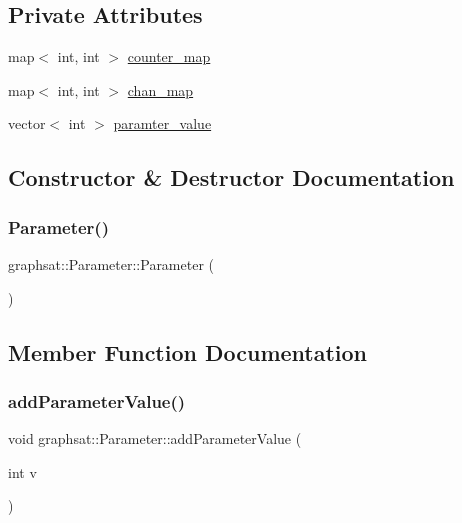 \subsection*{Private Attributes}
\begin{DoxyCompactItemize}
\item 
map$<$ int, int $>$ \mbox{\hyperlink{classgraphsat_1_1_parameter_a914222478bfceb8c804e00f39d60af64}{counter\+\_\+map}}
\item 
map$<$ int, int $>$ \mbox{\hyperlink{classgraphsat_1_1_parameter_ae05216a7ab70e07cfe1195338632d809}{chan\+\_\+map}}
\item 
vector$<$ int $>$ \mbox{\hyperlink{classgraphsat_1_1_parameter_aedd52a64c271b60c113f99e0e0ae9d6c}{paramter\+\_\+value}}
\end{DoxyCompactItemize}


\subsection{Constructor \& Destructor Documentation}
\mbox{\label{classgraphsat_1_1_parameter_a89c4d6947e1ff44bfbb4e85406321c06}} 
\subsubsection{\texorpdfstring{Parameter()}{Parameter()}}
{\footnotesize\ttfamily graphsat\+::\+Parameter\+::\+Parameter (\begin{DoxyParamCaption}{ }\end{DoxyParamCaption})\hspace{0.3cm}{\ttfamily [inline]}}



\subsection{Member Function Documentation}
\mbox{\label{classgraphsat_1_1_parameter_a9d1fc3675ee07f866afca38a9fd198ff}} 
\subsubsection{\texorpdfstring{addParameterValue()}{addParameterValue()}}
{\footnotesize\ttfamily void graphsat\+::\+Parameter\+::add\+Parameter\+Value (\begin{DoxyParamCaption}\item[{int}]{v }\end{DoxyParamCaption})\hspace{0.3cm}{\ttfamily [inline]}}

